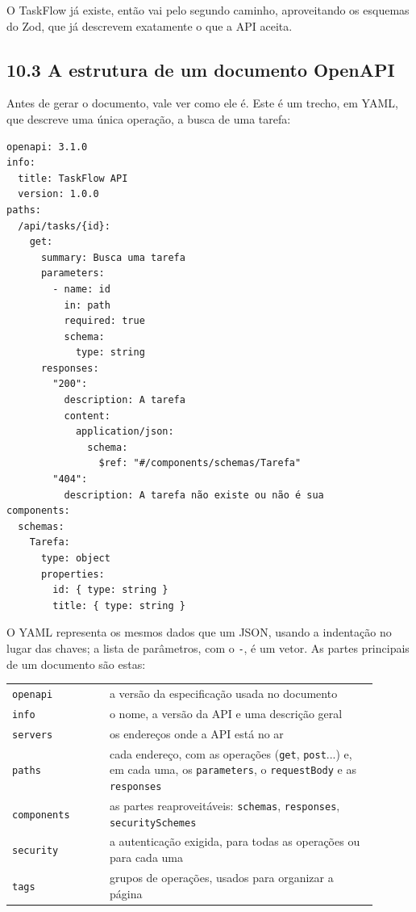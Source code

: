 O TaskFlow já existe, então vai pelo segundo caminho, aproveitando os esquemas do Zod, que já descrevem exatamente o que a API aceita.

\subsection{10.3 A estrutura de um documento OpenAPI}

Antes de gerar o documento, vale ver como ele é. Este é um trecho, em YAML, que descreve uma única operação, a busca de uma tarefa:

\begin{codigo}
\begin{Verbatim}[breaklines=true, breaksymbolleft={}, fontsize=\footnotesize]
openapi: 3.1.0
info:
  title: TaskFlow API
  version: 1.0.0
paths:
  /api/tasks/{id}:
    get:
      summary: Busca uma tarefa
      parameters:
        - name: id
          in: path
          required: true
          schema:
            type: string
      responses:
        "200":
          description: A tarefa
          content:
            application/json:
              schema:
                $ref: "#/components/schemas/Tarefa"
        "404":
          description: A tarefa não existe ou não é sua
components:
  schemas:
    Tarefa:
      type: object
      properties:
        id: { type: string }
        title: { type: string }
\end{Verbatim}
\end{codigo}

O YAML representa os mesmos dados que um JSON, usando a indentação no lugar das chaves; a lista de parâmetros, com o \texttt{-}, é um vetor. As partes principais de um documento são estas:

\begin{center}
\begin{tabular}{@{}P{0.24\linewidth}P{0.66\linewidth}@{}}
\toprule
{}
 &  \\
\midrule
\texttt{openapi} & a versão da especificação usada no documento \\
 \texttt{info} & o nome, a versão da API e uma descrição geral \\
\texttt{servers} & os endereços onde a API está no ar \\
 \texttt{paths} & cada endereço, com as operações (\texttt{get}, \texttt{post}...) e, em cada uma, os \texttt{parameters}, o \texttt{requestBody} e as \texttt{responses} \\
\texttt{components} & as partes reaproveitáveis: \texttt{schemas}, \texttt{responses}, \texttt{securitySchemes} \\
 \texttt{security} & a autenticação exigida, para todas as operações ou para cada uma \\
\texttt{tags} & grupos de operações, usados para organizar a página \\
\bottomrule
\end{tabular}
\end{center}

